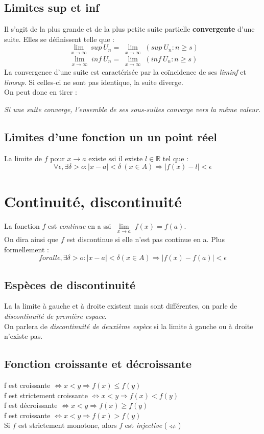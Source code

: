 \documentclass	[11pt, a4paper, openany]{book}
\begin{document}
\subsection{Limites sup et inf}
Il s'agit de la plus grande et de la plus petite suite partielle \textbf{convergente} d'une suite. Elles se définissent telle que :
$$ \lim\limits_{\substack{x \to \infty}} sup\ U_{n} = \lim\limits_{\substack{x \to \infty}} (sup\ {U_{n} : n \geq s})$$
$$ \lim\limits_{\substack{x \to \infty}} inf\ U_{n} = \lim\limits_{\substack{x \to \infty}} (inf\ {U_{n} : n \geq s})$$
La convergence d'une suite est caractérisée par la coïncidence de ses \textit{liminf} et \textit{limsup}. Si celles-ci ne sont pas identique, la suite diverge.\\
On peut donc en tirer :\\
\begin{center}
\textit{Si une suite converge, l'ensemble de ses sous-suites converge vers la même valeur.}
\end{center}

\subsection{Limites d'une fonction un un point réel}
La limite de $f$ pour $x \rightarrow a$ existe ssi il existe $l \in \mathbb{R}$ tel que : 
$$\forall \epsilon, \exists \delta > o : |x-a| < \delta\ (x \in A) \Rightarrow |f(x) - l| < \epsilon$$

\section{Continuité, discontinuité}
La fonction $f$ est \textit{continue} en a ssi $\lim\limits_{\substack{x \to a}} f(x) = f(a)$. \\
On dira ainsi que $f$ est discontinue si elle n'est pas continue en a. Plus formellement : 
$$forall \epsilon, \exists \delta > o : |x-a| < \delta (x \in A) \Rightarrow |f(x) - f(a)| < \epsilon$$

\subsection{Espèces de discontinuité}
La la limite à gauche et à droite existent mais sont différentes, on parle de \textit{discontinuité de première espace}.\\
On parlera de \textit{discontinuité de deuxième espèce} si la limite à gauche ou à droite n'existe pas.

\subsection{Fonction croissante et décroissante}
f est croissante $\Leftrightarrow x < y \Rightarrow f(x) \leq f(y)$\\
f est strictement croissante $\Leftrightarrow x < y \Rightarrow f(x) < f(y)$\\
f est décroissante $\Leftrightarrow x < y \Rightarrow f(x) \geq f(y)$\\
f est croissante $\Leftrightarrow x < y \Rightarrow f(x) > f(y)$\\
Si $f$ est strictement monotone, alors $f$ est \textit{injective} ($\nLeftarrow$)
\end{document}
